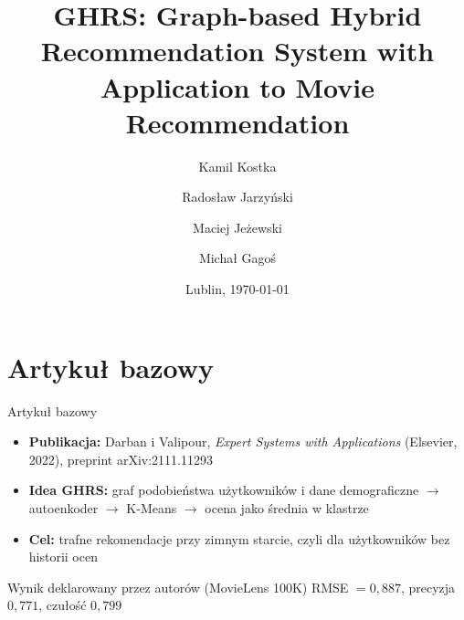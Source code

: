 \documentclass[red]{beamer}
\title[GHRS: miękkie metody klastrowania]{GHRS: Graph-based Hybrid Recommendation System with Application to Movie Recommendation}
\author[K. Kostka, R. Jarzyński, M. Jeżewski, M. Gagoś]{
    Kamil Kostka \and
    Radosław Jarzyński \and
    Maciej Jeżewski \and
    Michał Gagoś
}
\date{Lublin, \today}
\begin{document}
    \begin{frame}
    \titlepage
    \end{frame}

    \section{Artykuł bazowy}
    \begin{frame}{Artykuł bazowy}
        \small
        \begin{itemize}
            \item \textbf{Publikacja:} Darban i Valipour, \emph{Expert Systems with Applications}
                  (Elsevier, 2022), preprint arXiv:2111.11293
            \item \textbf{Idea GHRS:} graf podobieństwa użytkowników i dane demograficzne
                  $\rightarrow$ autoenkoder $\rightarrow$ K-Means $\rightarrow$ ocena jako
                  średnia w klastrze
            \item \textbf{Cel:} trafne rekomendacje przy zimnym starcie, czyli dla
                  użytkowników bez historii ocen
        \end{itemize}
        \begin{block}{Wynik deklarowany przez autorów (MovieLens 100K)}
            RMSE $= 0{,}887$, precyzja $0{,}771$, czułość $0{,}799$
        \end{block}
    \end{frame}
\end{document}
